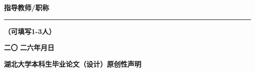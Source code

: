 \documentclass[a4paper,12pt]{article}
\begin{document}
\begin{titlepage}
\vspace{0.7cm}

\noindent
{\coverfont\bfseries{} 指导教师/职称} \rule[-0.3ex]{0.55\textwidth}{0.5pt}

\vspace{0.3cm}

\noindent
{\coverfont\bfseries{}（可填写1-3人）}

\vfill

\begin{center}
{\coverfont\bfseries{} 二}{\bfseries{}〇}{\coverfont\bfseries{} 二六\hspace{2em}年\hspace{2em}月\hspace{2em}日}
\end{center}

\end{titlepage}

\newpage
\thispagestyle{empty}

\vspace*{2em}

\begin{center}
{\bfseries 湖北大学本科生毕业论文（设计）原创性声明}
\end{center}

\vspace{0.5cm}
\end{document}
